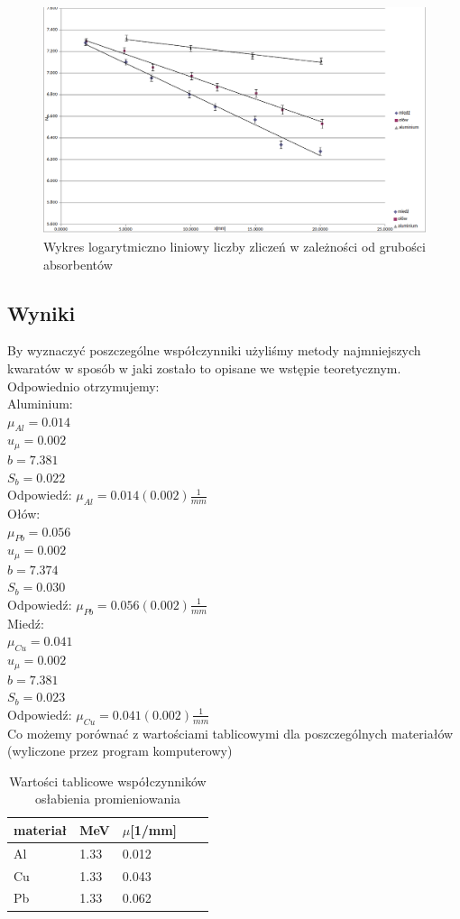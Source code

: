 \documentclass[a4paper]{article}
\begin{document}
\begin{figure}[h!]
\centering
\includegraphics[scale=0.51]{ln_x_wykres.png}
\caption{Wykres logarytmiczno liniowy liczby zliczeń w zależności od grubości absorbentów}
\label{}
\end{figure}

\newpage
\subsection{Wyniki}
By wyznaczyć poszczególne współczynniki użyliśmy metody najmniejszych kwaratów w sposób w jaki zostało to opisane we wstępie teoretycznym. Odpowiednio otrzymujemy: \\
Aluminium:\\
$\mu_{Al} = 0.014$\\
$u_{\mu} = 0.002$\\
$b = 7.381$\\
$S_{b} = 0.022$\\
Odpowiedź: $\mu_{Al} = 0.014(0.002) \frac{1}{mm}$\\
Ołów:\\
$\mu_{Pb} = 0.056$\\
$u_{\mu} = 0.002$\\
$b = 7.374$\\
$S_{b} = 0.030$\\

Odpowiedź: $\mu_{Pb} = 0.056(0.002) \frac{1}{mm}$\\
Miedź:\\
$\mu_{Cu} = 0.041$\\
$u_{\mu} = 0.002$\\
$b = 7.381$\\
$S_{b} = 0.023$\\
Odpowiedź: $\mu_{Cu} = 0.041(0.002) \frac{1}{mm}$ \\
Co możemy porównać z wartościami tablicowymi dla poszczególnych materiałów (wyliczone przez program komputerowy)
\begin{table}[h!]
\centering
\begin{tabular}{ | l | l | l | l | l | }
\hline
materiał & MeV & $\mu$[1/mm] \\ \hline
Al & 1.33 & 0.012 \\ \hline  
Cu & 1.33 & 0.043 \\ \hline  
Pb & 1.33 & 0.062 \\ \hline  
\end{tabular}
\caption{Wartości tablicowe współczynników osłabienia promieniowania}
\label{pomiary_sruba}
\end{table}
\end{document}
